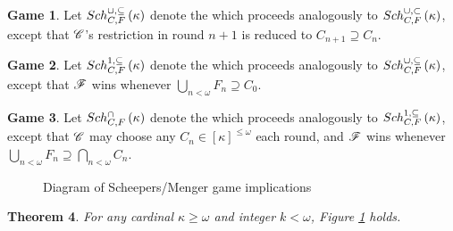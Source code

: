 \documentclass{amsart}
\newtheorem{theorem}{Theorem}[section]
\theoremstyle{definition}
\newtheorem{game}[theorem]{Game}
\begin{document}
\begin{game}
  Let \(Sch^{\cup,\subseteq}_{C,F}\left({\kappa}\right)\) denote the
   which proceeds analogously
  to \(Sch^{\cup,\subset}_{C,F}\left({\kappa}\right)\), except that \(\mathscr{C}\)'s restriction in round \(n+1\)
  is reduced to \(C_{n+1}\supseteq C_n\).
\end{game}

\begin{game}
  Let \(Sch^{1,\subseteq}_{C,F}\left({\kappa}\right)\) denote the
   which proceeds analogously
  to \(Sch^{\cup,\subseteq}_{C,F}\left({\kappa}\right)\), except that \(\mathscr{F}\) wins whenever
  \(\bigcup_{n<\omega}F_n\supseteq C_0\).
\end{game}

\begin{game}
  Let \(Sch^{\cap}_{C,F}\left({\kappa}\right)\) denote the
   which proceeds analogously
  to \(Sch^{1,\subseteq}_{C,F}\left({\kappa}\right)\), except that \(\mathscr{C}\) may choose any
  \(C_n\in[\kappa]^{\leq\omega}\) each round, and \(\mathscr{F}\) wins whenever
  \(\bigcup_{n<\omega}F_n\supseteq\bigcap_{n<\omega}C_n\).
\end{game}

\begin{figure}[h]
\begin{center}
\end{center}
\caption{Diagram of Scheepers/Menger game implications}
\label{fillingGamesDiagram}
\end{figure}

\begin{theorem}
For any cardinal \(\kappa\geq\omega\) and integer \(k<\omega\),
Figure \ref{fillingGamesDiagram} holds.
\end{theorem}
\end{document}
